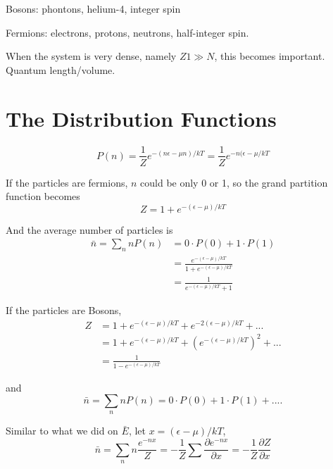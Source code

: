 Bosons: phontons, helium-4, integer spin

Fermions: electrons, protons, neutrons, half-integer spin.

When the system is very dense, namely $Z1 \gg N$, this becomes important.
Quantum length/volume.

\section{The Distribution Functions}
\begin{equation}
P(n) = \frac{1}{Z}e^{-(n\epsilon-\mu n)/kT} = \frac{1}{Z} e^{-n(\epsilon-\mu/kT}
\end{equation}

If the particles are fermions, $n$ could be only 0 or 1, so the grand partition function becomes
\begin{equation}
Z = 1 + e^{-(\epsilon-\mu)/kT}
\end{equation}

And the average number of particles is
\begin{equation}
\begin{split}
\bar{n} = \sum_n{nP(n)} &= 0\cdot P(0) + 1\cdot P(1) \\
                        &= \frac{e^{-(\epsilon-\mu)/kT}}{1+e^{-(\epsilon-\mu)/kT}}\\
                        &= \frac{1}{e^{-(\epsilon-\mu)/kT}+1}
\end{split}
\end{equation}


If the particles are Bosons,
\begin{equation}
\begin{split}
Z   & = 1 + e^{-(\epsilon-\mu)/kT} + e^{-2(\epsilon-\mu)/kT} + ...\\
    & = 1 + e^{-(\epsilon-\mu)/kT} + (e^{-(\epsilon-\mu)/kT})^2 + ...\\
    & = \frac{1}{1- e^{-(\epsilon-\mu)/kT}}
\end{split}
\end{equation}

and
\begin{equation}
\bar{n} = \sum_n{nP(n)} = 0\cdot P(0) + 1\cdot P(1) + ....
\end{equation}

Similar to what we did on $\bar{E}$, let $x = (\epsilon-\mu)/kT$,
\begin{equation}
\bar{n} = \sum_n{n \frac{e^{-nx}}{Z}} = -\frac{1}{Z} \sum{\frac{\partial e^{-nx}}{\partial x}} = -\frac{1}{Z}\frac{\partial Z}{\partial x}
\end{equation}

